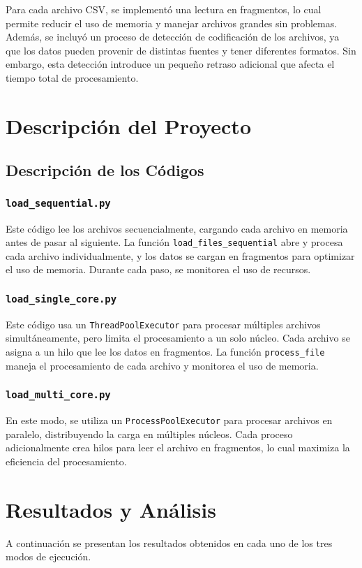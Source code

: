 \documentclass[a4paper,12pt]{report}
\begin{document}
Para cada archivo CSV, se implementó una lectura en fragmentos, lo cual permite reducir el uso de memoria y manejar archivos grandes sin problemas. Además, se incluyó un proceso de detección de codificación de los archivos, ya que los datos pueden provenir de distintas fuentes y tener diferentes formatos. Sin embargo, esta detección introduce un pequeño retraso adicional que afecta el tiempo total de procesamiento.

\chapter{Descripción del Proyecto}
\section{Descripción de los Códigos}
\subsection{\texttt{load\_sequential.py}}
Este código lee los archivos secuencialmente, cargando cada archivo en memoria antes de pasar al siguiente. La función \texttt{load\_files\_sequential} abre y procesa cada archivo individualmente, y los datos se cargan en fragmentos para optimizar el uso de memoria. Durante cada paso, se monitorea el uso de recursos.

\subsection{\texttt{load\_single\_core.py}}
Este código usa un \texttt{ThreadPoolExecutor} para procesar múltiples archivos simultáneamente, pero limita el procesamiento a un solo núcleo. Cada archivo se asigna a un hilo que lee los datos en fragmentos. La función \texttt{process\_file} maneja el procesamiento de cada archivo y monitorea el uso de memoria.

\subsection{\texttt{load\_multi\_core.py}}
En este modo, se utiliza un \texttt{ProcessPoolExecutor} para procesar archivos en paralelo, distribuyendo la carga en múltiples núcleos. Cada proceso adicionalmente crea hilos para leer el archivo en fragmentos, lo cual maximiza la eficiencia del procesamiento.

\chapter{Resultados y Análisis}
A continuación se presentan los resultados obtenidos en cada uno de los tres modos de ejecución.
\end{document}
